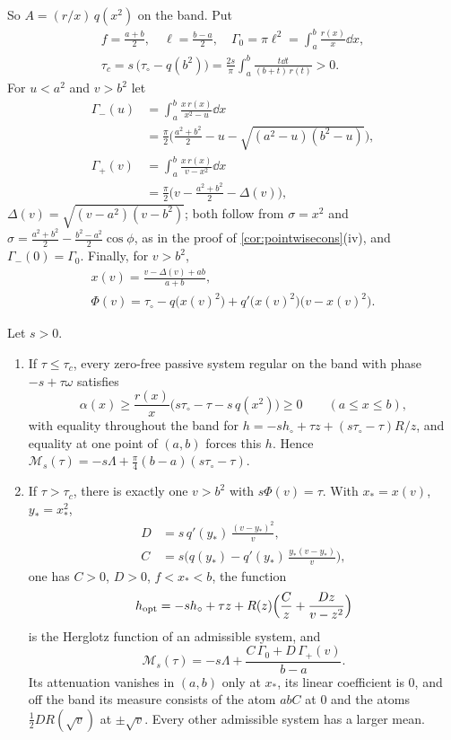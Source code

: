 So $A=(r/x)\,q(x^2)$ on the band. Put
\begin{gather*}
f=\frac{a+b}2,\quad \ell=\frac{b-a}2,\quad
\Gamma_0=\pi\ell^2=\int_a^b\frac{r(x)}x\dd x,\\
\tau_c=s\,\big(\tau_\circ-q(b^2)\big)=\frac{2s}\pi\int_a^b\frac{t\dd t}{(b+t)\,r(t)}>0 .
\end{gather*}
For $u<a^2$ and $v>b^2$ let
\begin{align*}
\Gamma_-(u)&=\int_a^b\frac{x\,r(x)}{x^2-u}\dd x\\
&=\frac\pi2\Big(\frac{a^2+b^2}2-u-\sqrt{(a^2-u)(b^2-u)}\Big),\\
\Gamma_+(v)&=\int_a^b\frac{x\,r(x)}{v-x^2}\dd x\\
&=\frac\pi2\Big(v-\frac{a^2+b^2}2-\Delta(v)\Big),
\end{align*}
$\Delta(v)=\sqrt{(v-a^2)(v-b^2)}$; both follow from $\sigma=x^2$ and
$\sigma=\frac{a^2+b^2}2-\frac{b^2-a^2}2\cos\phi$, as in the proof of
\cref{cor:pointwisecons}(iv), and $\Gamma_-(0)=\Gamma_0$. Finally, for
$v>b^2$,
\begin{gather*}
x(v)=\frac{v-\Delta(v)+ab}{a+b},\\
\Phi(v)=\tau_\circ-q\big(x(v)^2\big)+q'\big(x(v)^2\big)\big(v-x(v)^2\big).
\end{gather*}

\begin{theorem}\label{thm:exactmean}
Let $s>0$.
\begin{enumerate}
\item[(i)] If $\tau\le\tau_c$, every zero-free passive system regular on the
band with phase $-s+\tau\omega$ satisfies
\[
\alpha(x)\ge\frac{r(x)}x\big(s\tau_\circ-\tau-s\,q(x^2)\big)\ge0
\qquad(a\le x\le b),
\]
with equality throughout the band for $h=-sh_\circ+\tau z+(s\tau_\circ-\tau)R/z$,
and equality at one point of $(a,b)$ forces this $h$. Hence
$\mathcal M_s(\tau)=-s\Lambda+\frac\pi4(b-a)(s\tau_\circ-\tau)$.
\item[(ii)] If $\tau>\tau_c$, there is exactly one $v>b^2$ with
$s\Phi(v)=\tau$. With $x_*=x(v)$, $y_*=x_*^2$,
\begin{align*}
D&=s\,q'(y_*)\,\frac{(v-y_*)^2}v,\\
C&=s\Big(q(y_*)-q'(y_*)\,\frac{y_*(v-y_*)}v\Big),
\end{align*}
one has $C>0$, $D>0$, $f<x_*<b$, the function
\begin{equation}\label{eq:hexact}
h_{\rm opt}=-sh_\circ+\tau z+R(z)\Big(\frac Cz+\frac{Dz}{v-z^2}\Big)
\end{equation}
is the Herglotz function of an admissible system, and
\begin{equation}\label{eq:exactmean}
\mathcal M_s(\tau)=-s\Lambda+\frac{C\,\Gamma_0+D\,\Gamma_+(v)}{b-a} .
\end{equation}
Its attenuation vanishes in $(a,b)$ only at $x_*$, its linear coefficient is
$0$, and off the band its measure consists of the atom $abC$ at $0$ and the
atoms $\frac12DR(\sqrt v)$ at $\pm\sqrt v$. Every other admissible system has
a larger mean.
\end{enumerate}
\end{theorem}

